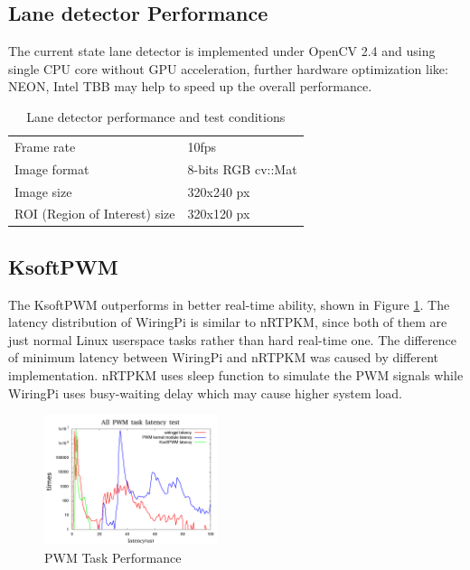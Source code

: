 \documentclass[conference]{IEEEtran}
\begin{document}
\subsection{Lane detector Performance}

The current state lane detector is implemented under OpenCV 2.4 and using single CPU core without GPU acceleration, further hardware optimization like: NEON, Intel TBB may help to speed up the overall performance.

\begin{table}[!htbp]
	\centering
	\caption{Lane detector performance and test conditions}
	\label{lane_detector_condition}
	\begin{tabular}{ll}
		Frame rate                      &10fps \\
		Image format                    &8-bits RGB cv::Mat \\
		Image size                      &320x240 px	 \\	
		ROI (Region of Interest) size   &320x120 px
	\end{tabular}
\end{table}

\subsection{KsoftPWM}

The KsoftPWM outperforms in better real-time ability, shown in Figure \ref{fig:ksoftpwm_perf}. The latency distribution of WiringPi is similar to nRTPKM, since both of them are just normal Linux userspace tasks rather than hard real-time one. The difference of minimum latency between WiringPi and nRTPKM was caused by different implementation. nRTPKM uses sleep function to simulate the PWM signals while WiringPi uses busy-waiting delay which may cause higher system load.

\begin{figure}
	\centering
	\includegraphics[width=2in]{img/ksoftpwm_load.png}
	\caption{PWM Task Performance}
	\label{fig:ksoftpwm_perf}
\end{figure}
\end{document}

